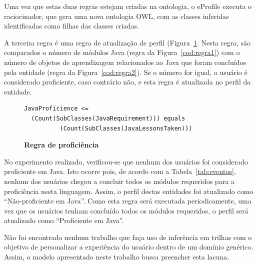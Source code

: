 \documentclass[times, 10pt, twocolumn]{article}
\begin{document}
Uma vez que estas duas regras estejam criadas na ontologia, o eProfile executa o raciocinador, que gera uma nova ontologia OWL, com as classes inferidas identificadas como filhas das classes criadas.

A terceira regra é uma regra de atualização de perfil (Figura~\ref{cod:regra3}. Nesta regra, são comparados o número de módulos Java (regra da Figura~\ref{cod:regra1}) com o número de objetos de aprendizagem relacionados ao Java que foram concluídos pela entidade (regra da Figura~\ref{cod:regra2}). Se o número for igual, o usuário é considerado proficiente, caso contrário não, e esta regra é atualizada no perfil da entidade.

\begin{figure}
\begin{lstlisting}
JavaProficience <= 
  (Count(SubClasses(JavaRequirement))) equals
          (Count(SubClasses(JavaLessonsTaken)))
\end{lstlisting}
\caption{\textbf{Regra de proficiência}}
\label{cod:regra3}
\end{figure}

No experimento realizado, verificou-se que nenhum dos usuários foi considerado proficiente em Java. Isto ocorre pois, de acordo com a Tabela~\ref{tab:eventos}, nenhum dos usuários chegou a concluir todos os módulos requeridos para a proficiência nesta linguagem. Assim, o perfil destas entidades foi atualizado como ``Não-proficiente em Java''. Como esta regra será executada periodicamente, uma vez que os usuários tenham concluído todos os módulos requeridos, o perfil será atualizado como ``Proficiente em Java''.

\label{ch:relacionados}

Não foi encontrado nenhum trabalho que faça uso de inferência em trilhas com o objetivo de personalizar a experiência do usuário dentro de um domínio genérico. Assim, o modelo apresentado neste trabalho busca preencher esta lacuna. 
\end{document}
